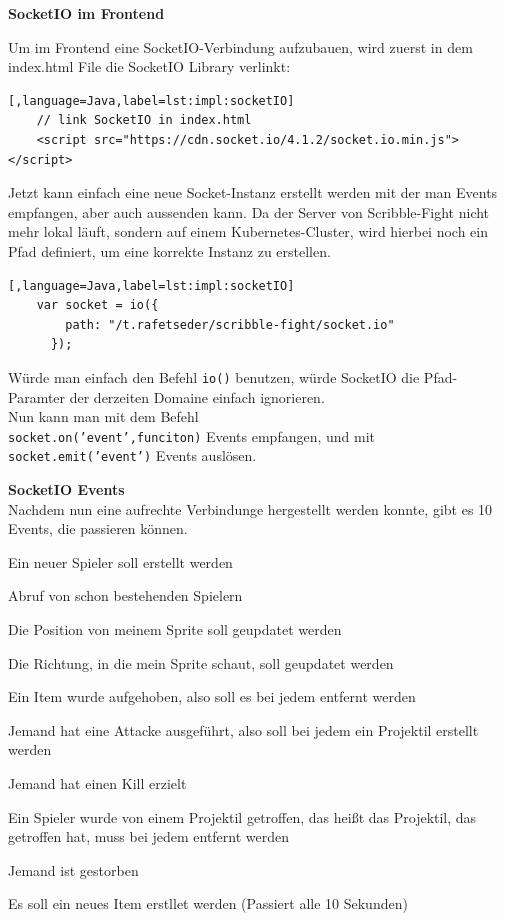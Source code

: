 \textbf{SocketIO im Frontend}

Um im Frontend eine SocketIO-Verbindung aufzubauen, wird zuerst in dem index.html File die SocketIO Library verlinkt:
\begin{lstlisting}[,language=Java,label=lst:impl:socketIO]
    // link SocketIO in index.html
    <script src="https://cdn.socket.io/4.1.2/socket.io.min.js"></script>
\end{lstlisting}

Jetzt kann einfach eine neue Socket-Instanz erstellt werden mit der man Events empfangen, aber auch aussenden kann. 
Da der Server von Scribble-Fight nicht mehr lokal läuft, sondern auf einem Kubernetes-Cluster, wird hierbei noch ein Pfad definiert, um eine korrekte Instanz zu erstellen.

\begin{lstlisting}[,language=Java,label=lst:impl:socketIO]
    var socket = io({
        path: "/t.rafetseder/scribble-fight/socket.io"
      }); 
\end{lstlisting}

Würde man einfach den Befehl \texttt{io()} benutzen, würde SocketIO die Pfad-Paramter der derzeiten Domaine einfach ignorieren. 
\\
Nun kann man mit dem Befehl
\\
\texttt{socket.on('event',funciton)} Events empfangen, und mit \texttt{socket.emit('event')} Events auslösen.

\textbf{SocketIO Events} \\
Nachdem nun eine aufrechte Verbindunge hergestellt werden konnte, gibt es 10 Events, die passieren können. 
\begin{compactitem}
    \item Ein neuer Spieler soll erstellt werden
    \item Abruf von schon bestehenden Spielern
    \item Die Position von meinem Sprite soll geupdatet werden
    \item Die Richtung, in die mein Sprite schaut, soll geupdatet werden
    \item Ein Item wurde aufgehoben, also soll es bei jedem entfernt werden
    \item Jemand hat eine Attacke ausgeführt, also soll bei jedem ein Projektil erstellt werden
    \item Jemand hat einen Kill erzielt
    \item Ein Spieler wurde von einem Projektil getroffen, das heißt das Projektil, das getroffen hat, muss bei jedem entfernt werden
    \item Jemand ist gestorben
    \item Es soll ein neues Item erstllet werden (Passiert alle 10 Sekunden)
\end{compactitem}


